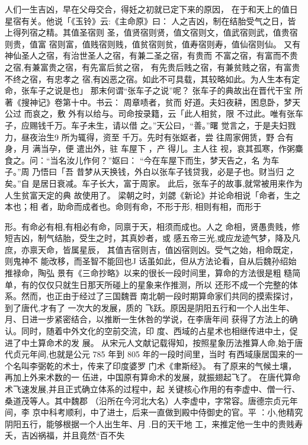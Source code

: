 人们一生吉凶，早在父母交合，得妊之初就已定下来的原因，
在于和天上的值日星宿有关。他说「《玉铃》云:《主命原》曰：
人之吉凶，制在结胎受气之日，皆上得列宿之精。其值圣宿则
圣，值贤宿则贤，值文宿则文，值武宿则武，值贵宿则贵，值富
宿则富，值贱宿则贱，值贫宿则贫，值寿宿则寿，值仙宿则仙。
又有神仙圣人之宿，有治世圣人之宿，有兼二圣之宿，有贵而
不富之宿，有富而不贵之宿,有兼富贵之宿，有先富后贫之宿，
有先贵后贱之宿，有兼贫贱之宿，有富贵不终之宿，有忠孝之
宿,有凶恶之宿。如此不可具载，其较略如此。为人生本有定
命，张车子之说是也」
那末何谓“张车子之说”呢？ 张车子的典故出在晋代干宝
所著《搜神记》卷第十中。书云：
周章啧者，贫而 好道。夫妇夜耕，困息卧，梦天公过
而哀之，敷 外有以给与。司命按录籍，云「此人相贫，限
不过此。唯有张车子，应赐钱千万。车子未生，请以借
之。”天公曰，“善。”曙 觉言之，于是夫妇戮力，昼夜治生9
所为辄得，资至 千万。先时有张妪者，尝 往周家佣赁，野
合有身，月 满当孕，便 遣出外，驻 车屋下 ，产 得儿。主人往
视，哀其孤寒，作粥麋食之。问：“当名汝儿作何？”妪曰：
“今在车屋下而生，梦天告之，名 为车子。”周 乃悟曰「吾
昔梦从天换钱，外白以张车子钱贷我，必是子也。财当归
之矣。”自 是居日衰减。车子长大，富于周家。
此后，张车子的故事,就常被用来作为人生贫富天定的典
故使用了。
梁朝之时，刘勰《新论》并论命相说「命者，生之本也；相
者，助命而成者也。命则有命，不形于形, 相则有相，而形于

形。有命必有相,有相必有命，同禀于天，相须而成也。人之
命相，贤愚贵贱，修短吉凶，制气结胎，受生之时，其真妙者，或
感五帝三光,或应龙迹气梦，降及凡庶，亦禀天命，皆属星辰，
其值吉宿则吉，值凶宿则凶。受气之始，相命既定，则鬼神不
能改移，而圣智不能回也J
话虽如此，但从方法论看，自从后魏孙绍始推禄命，陶弘
景有《三命抄略》以来的很长一段时间里，算命的方法很是粗
糙简单，有的仅仅只就生日那天所碰上的星象来作推测，所以
还形不成一个完整的体系。然而，也正由于经过了三国魏晋
南北朝一段时期算命家们共同的摸索探讨，到了唐代,才有了
一次大的发展，质的 飞跃。原因是阴阳五行和一个人出生年、
月、日进一步紧密结合，以推断一生休咎的学说，在李唐年间
获得了方法上的确认。同时，随着中外文化的空前交流，印
度、西域的占星术也相继传进中土，促进了中土算命术的发
展。
从宋元人文献记载得知，按照星象历法推算人命,始于唐
代贞元年间,也就是公元 785 年到 805 年的一段时间里，当时
有西域康居国来的一个名叫李弼乾的术士，传来了印度婆罗
门术《聿斯经》。 有了原来的气候土壤，再加上外来术数的一
伍进，中国原有算命术的发展，就振翅起飞了。
在唐代算命术飞速发展,并且正式确立体系的过程中，起
关键核心作用的有李虚中、僧一行、桑道茂等人。其中魏郡
（沿所在今河北大名）人李虚中，字常容。唐德宗贞元年间，李
京中科考顺利，中了进士，后来一直做到殿中侍御史的官。平
：小,他精究阴阳五行，能够根据一个人出生年、月 .日的天干地
工，来推定他一生中的贵贱寿夭，吉凶祸福，并且竟然“百不失


